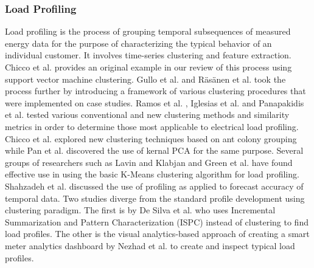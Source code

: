\subsubsection{Load Profiling}
Load profiling is the process of grouping temporal subsequences of measured energy data for the purpose of characterizing the typical behavior of an individual customer. It involves time-series clustering and feature extraction. Chicco et al. \cite{chicco_support_2009} provides an original example in our review of this process using support vector machine clustering. Gullo et al. \cite{gullo_low-voltage_2009} and R\"as\"anen et al. \cite{rasanen_feature-based_2009} took the process further by introducing a framework of various clustering procedures that were implemented on case studies. Ramos et al. \cite{ramos_typical_2012}, Iglesias et al. \cite{iglesias_analysis_2013} and Panapakidis et al. \cite{panapakidis_evaluation_2015} tested various conventional and new clustering methods and similarity metrics in order to determine those most applicable to electrical load profiling. Chicco et al. \cite{chicco_electrical_2013} explored new clustering techniques based on ant colony grouping while Pan et al. \cite{pan_kernel-based_2015} discovered the use of kernal PCA for the same purpose. Several groups of researchers such as Lavin and Klabjan \cite{lavin_clustering_2014} and Green et al. \cite{green_divide_2014} have found effective use in using the basic K-Means clustering algorithm for load profiling. Shahzadeh et al. \cite{shahzadeh_improving_2015} discussed the use of profiling as applied to forecast accuracy of temporal data. Two studies diverge from the standard profile development using clustering paradigm. The first is by De Silva et al. \cite{de_silva_data_2011} who uses Incremental Summarization and Pattern Characterization (ISPC) instead of clustering to find load profiles. The other is the visual analytics-based approach of creating a smart meter analytics dashboard by Nezhad et al. \cite{jarrah_nezhad_smartd:_2014} to create and inspect typical load profiles.

